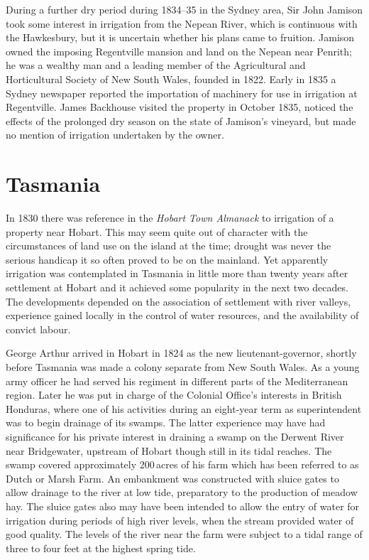 During a further dry period during 1834--35 in the Sydney area, Sir
John Jamison took some interest in irrigation from
the Nepean River,  which is continuous with the
Hawkesbury, but it is uncertain whether his plans came to fruition.
Jamison owned the imposing Regentville 
mansion and land on the Nepean near Penrith;  he
was a wealthy man and a leading member of the Agricultural and
Horticultural Society of New South Wales, founded in 1822.  Early in
1835 a Sydney newspaper reported the importation of machinery for use
in irrigation at Regentville.  James Backhouse
visited the property in October 1835, noticed the effects of the
prolonged dry season on the state of Jamison's vineyard, but made no
mention of irrigation undertaken by the owner.

\section*{Tasmania}
\label{sec:tas}

In 1830 there was reference in the \textsl{Hobart Town Almanack} to
irrigation of a property near Hobart. This may
seem quite out of character with the circumstances of land use on the
island at the time; drought was never the serious handicap it so often
proved to be on the mainland.  Yet apparently irrigation was
contemplated in Tasmania in little more than twenty years after
settlement at Hobart and it achieved some popularity in the next two
decades.  The developments depended on the association of settlement
with river valleys, experience gained locally in the control of water
resources, and the availability of convict labour.

George Arthur arrived in Hobart in 1824 as the new
lieutenant-gov\-er\-nor, shortly before Tasmania was made a colony
separate from New South Wales.  As a young army officer he had served
his regiment in different parts of the Mediterranean region.  Later he
was put in charge of the Colonial Office's interests in British
Honduras, where one of his activities during an eight-year term as
superintendent was to begin drainage of its swamps.  The latter
experience may have had significance for his private interest in
draining a swamp on the Derwent River near
Bridgewater, upstream of Hobart though still
in its tidal reaches. The swamp covered approximately 200\,acres of
his farm which has been referred to as Dutch or Marsh
Farm. An embankment was constructed with sluice
gates to allow drainage to the river at low tide, preparatory to the
production of meadow hay.  The sluice gates also may have been
intended to allow the entry of water for irrigation during periods of
high river levels, when the stream provided water of good quality.
The levels of the river near the farm were subject to a tidal range of
three to four feet at the highest spring tide.

